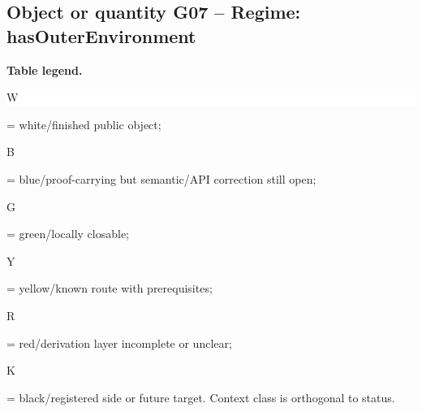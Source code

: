 \subsection*{Object or quantity G07 -- Regime: hasOuterEnvironment}
\hypertarget{objproof:G07}{}
\par\smallskip\noindent\begin{minipage}{0.99\linewidth}\footnotesize\raggedright\textbf{Table legend.} \colorbox{white}{\strut W} = white/finished public object; \colorbox{cyan!20}{\strut B} = blue/proof-carrying but semantic/API correction still open; \colorbox{green!18}{\strut G} = green/locally closable; \colorbox{yellow!25}{\strut Y} = yellow/known route with prerequisites; \colorbox{red!20}{\strut R} = red/derivation layer incomplete or unclear; \colorbox{black!18}{\strut K} = black/registered side or future target. Context class is orthogonal to status.\end{minipage}\par\vspace{0.25em}
